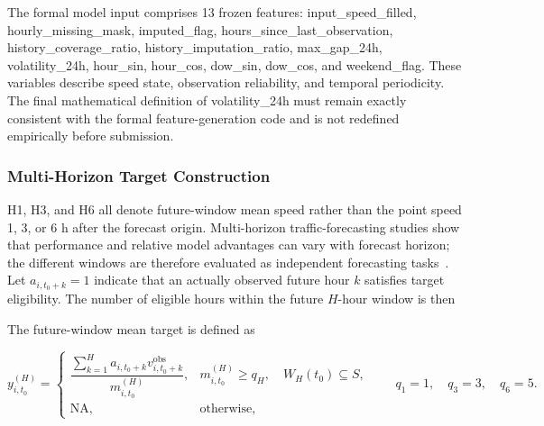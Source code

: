 \documentclass[pdflatex,sn-mathphys-num,iicol]{sn-jnl}
\begin{document}
The formal model input comprises 13 frozen features: input\_speed\_filled, hourly\_missing\_mask, imputed\_flag, hours\_since\_last\_observation, history\_coverage\_ratio, history\_imputation\_ratio, max\_gap\_24h, volatility\_24h, hour\_sin, hour\_cos, dow\_sin, dow\_cos, and weekend\_flag. These variables describe speed state, observation reliability, and temporal periodicity. The final mathematical definition of volatility\_24h must remain exactly consistent with the formal feature-generation code and is not redefined empirically before submission.



\subsubsection{Multi-Horizon Target Construction}
\label{subsubsec:multi-horizon-target}

H1, H3, and H6 all denote future-window mean speed rather than the point speed 1, 3, or 6 h after the forecast origin. Multi-horizon traffic-forecasting studies show that performance and relative model advantages can vary with forecast horizon; the different windows are therefore evaluated as independent forecasting tasks~\cite{Hadry2025TrafficForecasting,Zeb2024FeatureProjection,Du2025TrafficSurvey}. Let $a_{i,t_0+k}=1$ indicate that an actually observed future hour $k$ satisfies target eligibility. The number of eligible hours within the future $H$-hour window is then

The future-window mean target is defined as

\begin{equation}
y^{(H)}_{i,t_0}
=
\begin{cases}
\dfrac{
\displaystyle\sum_{k=1}^{H}
a_{i,t_0+k}
v^{\mathrm{obs}}_{i,t_0+k}
}{
m^{(H)}_{i,t_0}
},
&
m^{(H)}_{i,t_0}\geq q_H,
\quad
W_H(t_0)\subseteq S,
\\[12pt]

\mathrm{NA},
&
\text{otherwise},
\end{cases}
\qquad
q_1=1,\quad q_3=3,\quad q_6=5.
\label{eq:multi-horizon-target}
\end{equation}
\end{document}
